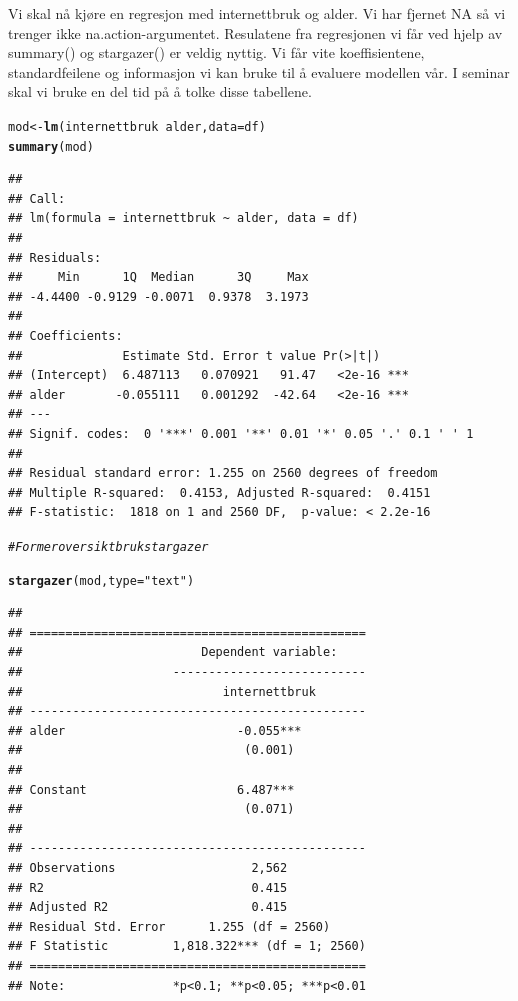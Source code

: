 \documentclass{article}\usepackage[]{graphicx}\usepackage[]{color}
\makeatletter
\newcommand{\hlstr}[1]{\textcolor[rgb]{0.192,0.494,0.8}{#1}}%
\newcommand{\hlcom}[1]{\textcolor[rgb]{0.678,0.584,0.686}{\textit{#1}}}%
\newcommand{\hlopt}[1]{\textcolor[rgb]{0,0,0}{#1}}%
\newcommand{\hlstd}[1]{\textcolor[rgb]{0.345,0.345,0.345}{#1}}%
\newcommand{\hlkwb}[1]{\textcolor[rgb]{0.69,0.353,0.396}{#1}}%
\newcommand{\hlkwc}[1]{\textcolor[rgb]{0.333,0.667,0.333}{#1}}%
\newcommand{\hlkwd}[1]{\textcolor[rgb]{0.737,0.353,0.396}{\textbf{#1}}}%
\newenvironment{kframe}{%
 \def\at@end@of@kframe{}%
 \ifinner\ifhmode%
  \def\at@end@of@kframe{\end{minipage}}%
  \begin{minipage}{\columnwidth}%
 \fi\fi%
 \def\FrameCommand##1{\hskip\@totalleftmargin \hskip-\fboxsep
 \colorbox{shadecolor}{##1}\hskip-\fboxsep
     \hskip-\linewidth \hskip-\@totalleftmargin \hskip\columnwidth}%
 \MakeFramed {\advance\hsize-\width
   \@totalleftmargin\z@ \linewidth\hsize
   \@setminipage}}%
 {\par\unskip\endMakeFramed%
 \at@end@of@kframe}
\newenvironment{knitrout}{}{} %
\makeatother
\begin{document}
\hfill \break Vi skal nå kjøre en regresjon med internettbruk og alder. Vi har fjernet NA så vi trenger ikke na.action-argumentet. Resulatene fra regresjonen vi får ved hjelp av summary() og stargazer() er veldig nyttig. Vi får vite koeffisientene, standardfeilene og informasjon vi kan bruke til å evaluere modellen vår. I seminar skal vi bruke en del tid på å tolke disse tabellene.

\begin{knitrout}
\color{fgcolor}\begin{kframe}
\begin{alltt}
\hlstd{mod} \hlkwb{<-} \hlkwd{lm}\hlstd{(internettbruk} \hlopt{~} \hlstd{alder,} \hlkwc{data} \hlstd{= df)}
\hlkwd{summary}\hlstd{(mod)}
\end{alltt}
\begin{verbatim}
## 
## Call:
## lm(formula = internettbruk ~ alder, data = df)
## 
## Residuals:
##     Min      1Q  Median      3Q     Max 
## -4.4400 -0.9129 -0.0071  0.9378  3.1973 
## 
## Coefficients:
##              Estimate Std. Error t value Pr(>|t|)    
## (Intercept)  6.487113   0.070921   91.47   <2e-16 ***
## alder       -0.055111   0.001292  -42.64   <2e-16 ***
## ---
## Signif. codes:  0 '***' 0.001 '**' 0.01 '*' 0.05 '.' 0.1 ' ' 1
## 
## Residual standard error: 1.255 on 2560 degrees of freedom
## Multiple R-squared:  0.4153,	Adjusted R-squared:  0.4151 
## F-statistic:  1818 on 1 and 2560 DF,  p-value: < 2.2e-16
\end{verbatim}
\begin{alltt}
\hlcom{# For mer oversikt bruk stargazer }

\hlkwd{stargazer}\hlstd{(mod,} \hlkwc{type} \hlstd{=} \hlstr{"text"}\hlstd{)}
\end{alltt}
\begin{verbatim}
## 
## ===============================================
##                         Dependent variable:    
##                     ---------------------------
##                            internettbruk       
## -----------------------------------------------
## alder                        -0.055***         
##                               (0.001)          
##                                                
## Constant                     6.487***          
##                               (0.071)          
##                                                
## -----------------------------------------------
## Observations                   2,562           
## R2                             0.415           
## Adjusted R2                    0.415           
## Residual Std. Error      1.255 (df = 2560)     
## F Statistic         1,818.322*** (df = 1; 2560)
## ===============================================
## Note:               *p<0.1; **p<0.05; ***p<0.01
\end{verbatim}
\end{kframe}
\end{knitrout}
\end{document}
